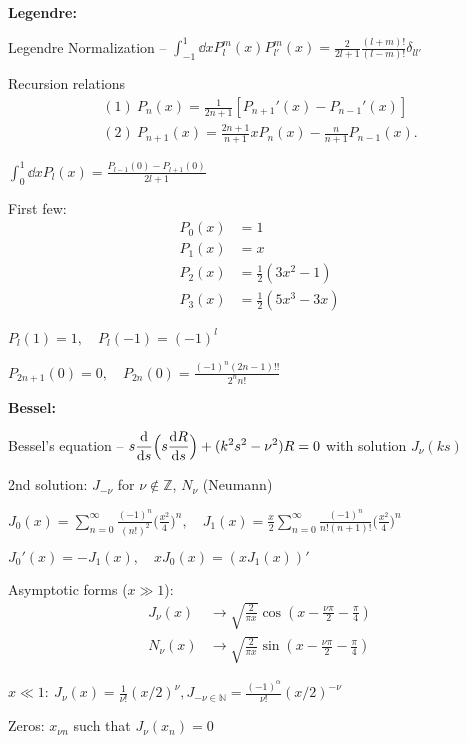 \textbf{Legendre:}

Legendre Normalization -- $\displaystyle \int_{-1}^{1} \dd{x} P_{l}^{m}(x) P_{l'}^{m}(x) = \frac{2}{2l+1} \frac{(l+m)!}{(l-m)!} \delta_{ll'}$

Recursion relations
\begin{gather}
    (1)~P_{n}(x) = \frac{1}{2n+1} [ P_{n+1}'(x) - P_{n-1}'(x) ] \\
    (2)~P_{n+1}(x) = \frac{2n+1}{n+1} xP_{n}(x) - \frac{n}{n+1}P_{n-1}(x)
.\end{gather}

$\displaystyle \int_{0}^{1} \dd{x} P_{l}(x) = \frac{P_{l-1}(0) - P_{l+1}(0)}{2l+1}$

First few:
\begin{align}
    P_0(x) &= 1 \\
    P_1(x) &= x \\
    P_2(x) &= \frac{1}{2} ( 3x^2 - 1 ) \\
    P_3(x) &= \frac{1}{2} ( 5x^3 - 3x )
\end{align}

$P_{l}(1) = 1, \quad P_{l}(-1) = (-1)^{l}$

$\displaystyle P_{2n+1}(0) = 0,\quad P_{2n}(0) = \frac{(-1)^{n} (2n-1)!!}{2^{n} n!}$

\textbf{Bessel:}

Bessel's equation -- $\displaystyle s \dv{s} \Big( s \dv{R}{s} \Big) + (k^2s^2 - \nu^2) R = 0$ with solution $J_{\nu}(ks)$

2nd solution: $J_{-\nu}$ for $\nu \not\in \mathbb{Z}$, $N_{\nu}$ (Neumann)

$\displaystyle J_0(x) = \sum_{n=0}^{\infty} \frac{(-1)^{n}}{(n!)^2} \Big( \frac{x^2}{4} \Big)^{n}, \quad J_1(x) = \frac{x}{2} \sum_{n=0}^{\infty} \frac{(-1)^{n}}{n!(n+1)!} \Big( \frac{x^2}{4} \Big)^{n}$

$J_0'(x) = -J_1(x), \quad x J_0(x) = (x J_1(x))'$

Asymptotic forms ($x \gg 1$):
\begin{align}
    J_{\nu}(x) &\rightarrow \sqrt{\frac{2}{\pi x}} \cos( x - \frac{\nu \pi}{2} - \frac{\pi}{4} ) \\
    N_{\nu}(x) &\rightarrow \sqrt{\frac{2}{\pi x}} \sin(x - \frac{\nu \pi}{2} - \frac{\pi}{4})
\end{align}

$\displaystyle x \ll 1:~J_{\nu}(x) = \frac{1}{\nu!} (x/2)^{\nu},J_{-\nu\in\mathbb{N}} = \frac{(-1)^{\alpha}}{\nu!} (x/2)^{-\nu}$

Zeros: $x_{\nu n}$ such that $J_{\nu}(x_{n}) = 0$

